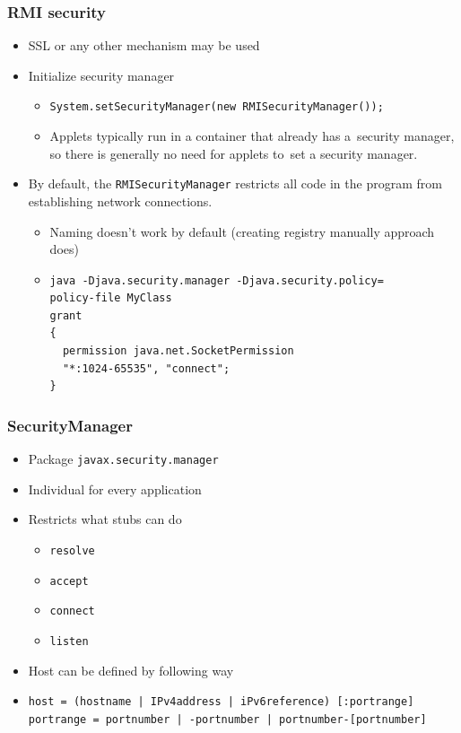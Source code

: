 \documentclass[10pt,xcolor=pdflatex]{beamer}
\begin{document}
\begin{frame}[containsverbatim]\frametitle{RMI security}
\begin{itemize}
	\item SSL or any other mechanism may be used
	\item Initialize security manager
	  \begin{itemize}
		\item \texttt{System.setSecurityManager(new RMISecurityManager());}
        \item Applets typically run in a container that already has a~security manager, so there is generally no need for applets to~set a security manager.
	  \end{itemize}
    \item By default, the \texttt{RMISecurityManager} restricts all code in the program from establishing network connections.
      \begin{itemize}
    	\item Naming doesn't work by default (creating registry manually approach does) 
        \vspace*{0.1cm}
        \item[] \begin{footnotesize}
         \begin{verbatim}
java -Djava.security.manager -Djava.security.policy=
policy-file MyClass
grant
{
  permission java.net.SocketPermission
  "*:1024-65535", "connect";
}
        \end{verbatim}
        \end{footnotesize}
      \end{itemize}
\end{itemize}
\end{frame}


\begin{frame}[containsverbatim]\frametitle{SecurityManager}
\begin{itemize}
    \item Package \texttt{javax.security.manager}
	\item Individual for every application
	\item Restricts what stubs can do
	  \begin{itemize}
		\item \texttt{resolve}
		\item \texttt{accept}
		\item \texttt{connect}
		\item \texttt{listen}
	  \end{itemize}
    \item Host can be defined by following way
    \item[] \begin{footnotesize}\begin{verbatim}
host = (hostname | IPv4address | iPv6reference) [:portrange]
portrange = portnumber | -portnumber | portnumber-[portnumber]
\end{verbatim}\end{footnotesize}
\end{itemize}
\end{frame}
\end{document}
